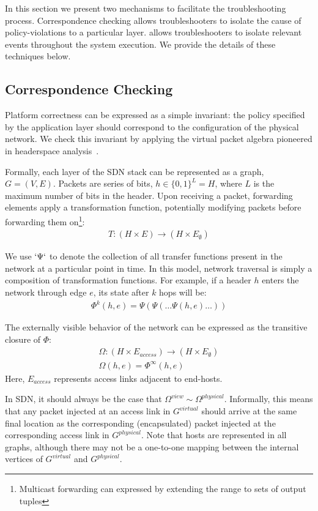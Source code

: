 In this section we present two mechanisms to facilitate the troubleshooting
process. Correspondence checking allows troubleshooters to isolate
the cause of policy-violations to a particular layer. \Simulator{}
allows troubleshooters to isolate relevant events throughout the system
execution. We provide the details of these techniques below. 

\subsection{Correspondence Checking}

Platform correctness can be expressed as a simple invariant:
the policy specified by the application layer should correspond to the
configuration of the
physical network. We check this invariant by applying the virtual packet
algebra pioneered in headerspace analysis~\cite{hsa}. 

Formally, each layer of the SDN stack can be represented as a graph,
$G = (V, E)$. Packets are series of bits, $h \in \{0,1\}^L = H$,
where $L$ is the maximum number of bits in the header. Upon receiving a packet,
forwarding elements apply a transformation function, potentially modifying
packets before forwarding them on\footnote{Multicast forwarding can expressed
by extending the range to sets of output tuples}:
\begin{align*}
T: (H \times E) \rightarrow (H \times E_{\emptyset})
\end{align*}

We use $`\Psi`$ to denote the collection of all transfer functions present in
the network at a particular point in time. In this model, network traversal is simply a composition of transformation
functions. For example, if a header $h$ enters the network through edge
$e$, its state after $k$ hops will be:
\begin{align*}
\Phi^k(h,e) = \Psi(\Psi(\dots \Psi(h,e)\dots))
\end{align*}

The externally visible behavior of the network can be expressed as the
transitive closure of $\Phi$:
\begin{align*}
\Omega: (H \times E_{access}) \rightarrow (H \times E_{\emptyset}) \\
\Omega(h,e) = \Phi^{\infty}(h,e)
\end{align*}
Here, $E_{access}$ represents access links adjacent to end-hosts.

In SDN, it should always be the case that 
$\Omega^{view} \sim \Omega^{physical}$. Informally, this means that
any packet injected at an access link in $G^{virtual}$ should arrive at
the same final location as the corresponding (encapsulated) packet injected at the
corresponding access link in $G^{physical}$. Note that hosts are represented
in all graphs, although there may not be a one-to-one mapping between the
internal vertices of $G^{virtual}$ and $G^{physical}$.

